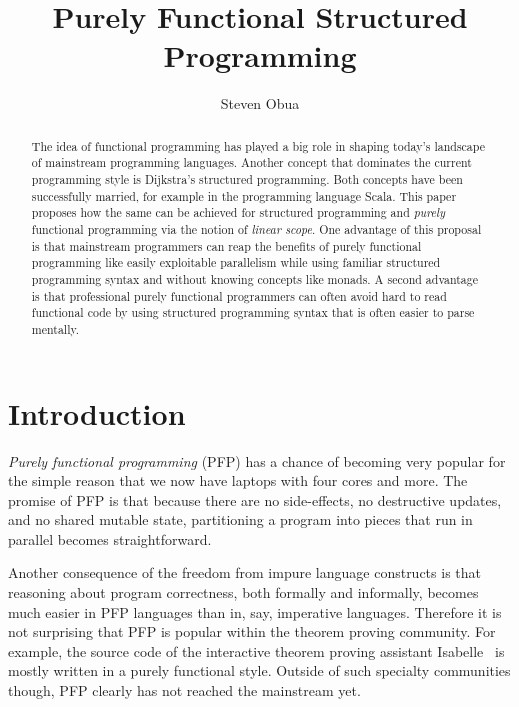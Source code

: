 \documentclass{llncs}
\begin{document}
\title{Purely Functional Structured Programming}

\author{Steven Obua}
\institute{}
\date{}



\maketitle

\begin{abstract}
The idea of functional programming has played a big role in shaping today's landscape of mainstream programming languages. 
Another concept that dominates the current programming style is Dijkstra's structured programming. Both concepts have been successfully married, for example in the programming language Scala. This paper proposes how the same can be achieved for structured programming and \emph{purely} functional programming via the notion of \emph{linear scope}. 
One advantage of this proposal is that mainstream programmers can reap the benefits of purely functional programming like easily exploitable parallelism  while using familiar structured programming syntax and without knowing concepts like monads. A second advantage is that professional purely functional programmers can often avoid hard to read functional code by using structured programming syntax that is often easier to parse mentally.
\end{abstract}

\section{Introduction}
\emph{Purely functional programming} (PFP) has a chance of becoming very popular for the simple reason that we now have laptops with four cores and more. The promise of PFP is that because there are no side-effects, no destructive updates, and no shared mutable state, partitioning a program into pieces that run in parallel becomes straightforward. 

Another consequence of the freedom from impure language constructs is that reasoning about program correctness, both formally and informally, becomes much easier in PFP languages than in, say, imperative languages. Therefore it is not surprising that PFP is popular within the theorem proving community.  For example, the source code of the interactive theorem proving assistant Isabelle~\cite{isabelle} is mostly written in a purely functional style. Outside of such specialty communities though, PFP clearly has not reached the mainstream yet. 
\end{document}
